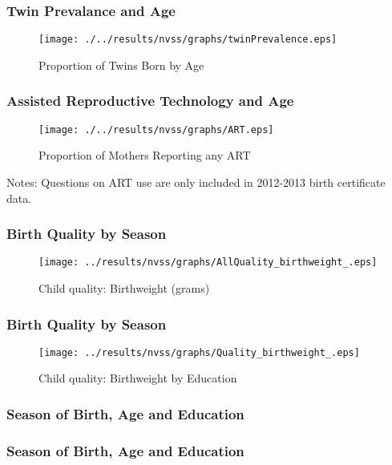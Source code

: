 \documentclass[10pt,letterpaper,subeqn]{beamer}
\begin{document}
\begin{frame}[label=twins]
\frametitle{Twin Prevalance and Age}
\begin{figure}[htpb!]
\begin{center}
  \centering
  \caption{Proportion of Twins Born by Age}
  \texttt{[image: ./../results/nvss/graphs/twinPrevalence.eps]}
  \label{fig:NVSSTwins}
\end{center}
\end{figure}
\vspace{-5mm}
\end{frame}


\begin{frame}[label=ART]
\frametitle{Assisted Reproductive Technology and Age}
\begin{figure}[htpb!]
\begin{center}
  \centering
  \caption{Proportion of Mothers Reporting any ART}
  \texttt{[image: ./../results/nvss/graphs/ART.eps]}
  \label{fig:NVSSART}
\end{center}
\end{figure}
\vspace{-5mm}
\footnotesize{Notes: Questions on ART use are only included in 2012-2013 
birth certificate data.}
\end{frame}


\begin{frame}[label=QBw]
\frametitle{Birth Quality by Season}
\begin{figure}[htpb!]
\centering
\caption{Child quality: Birthweight (grams)}
\label{QBwt}
\texttt{[image: ../results/nvss/graphs/AllQuality\_birthweight\_.eps]}
\end{figure}
\end{frame}

\begin{frame}[label=QBwEd]
\frametitle{Birth Quality by Season}
\begin{figure}[htpb!]
\centering
\caption{Child quality: Birthweight by Education}
\label{QBwtEd}
\texttt{[image: ../results/nvss/graphs/Quality\_birthweight\_.eps]}
\end{figure}
\end{frame}

\begin{frame}[label=NVSSseason]
\frametitle{Season of Birth, Age and Education}

\end{frame}

\begin{frame}[label=NVSSseasonQ]
\frametitle{Season of Birth, Age and Education}

\end{frame}
\end{document}
